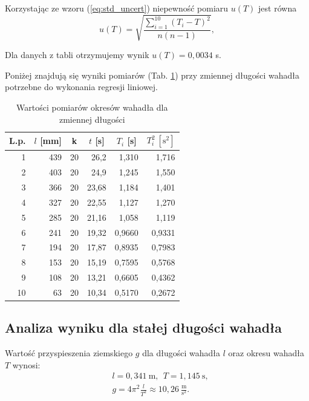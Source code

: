 \documentclass[12pt,a4paper]{article}
\numberwithin{equation}{section}
\begin{document}
Korzystając ze wzoru (\ref{eq:std_uncert}) niepewność pomiaru $u(T)$ jest równa
\begin{equation}
	u(T) = \sqrt{\frac{\sum_{i=1}^{10}(T_i - T)^2}{n(n-1)}},
\end{equation}

Dla danych z tabli otrzymujemy wynik $u(T) = 0,0034$ s.

Poniżej znajdują się wyniki pomiarów (Tab. \ref{tab:tab2}) przy zmiennej długości wahadła potrzebne do wykonania regresji liniowej.
\begin{table}[!ht]
	\caption{Wartości pomiarów okresów wahadła dla zmiennej długości}
	\begin{center}
		\begin{tabular}{r|r|r|r|r|r}
			\hline
			\multicolumn{1}{c|}{L.p.} & \multicolumn{1}{c|}{$l$ [mm]} & \multicolumn{1}{c|}{k} & \multicolumn{1}{c|}{$t$ [s]} & \multicolumn{1}{c|}{$T_i$ [s]} & \multicolumn{1}{c}{$T_{i}^{2} ~[\textrm{s}^2]$} \\ \hline \hline
			1 & 439 & 20 & 26,2 & 1,310 & 1,716 \\
			2 & 403 & 20 & 24,9 & 1,245 & 1,550 \\
			3 & 366 & 20 & 23,68 & 1,184 & 1,401 \\
			4 & 327 & 20 & 22,55 & 1,127 & 1,270 \\
			5 & 285 & 20 & 21,16 & 1,058 & 1,119\\
			6 & 241 & 20 & 19,32 & 0,9660 & 0,9331 \\
			7 & 194 & 20 & 17,87 & 0,8935 & 0,7983 \\
			8 & 153 & 20 & 15,19 & 0,7595 & 0,5768 \\
			9 & 108 & 20 & 13,21 & 0,6605 & 0,4362 \\
			10 & 63 & 20 & 10,34 & 0,5170 & 0,2672 \\ \hline
		\end{tabular}
	\end{center}
	\label{tab:tab2}
\end{table}

\pagebreak
\subsection{Analiza wyniku dla stałej długości wahadła}
Wartość przyspieszenia ziemskiego $g$ dla długości wahadła $l$ oraz okresu wahadła $T$ wynosi:
\begin{equation}
	\begin{split}
		&l = 0,341~\textrm{m},~~T = 1,145~\textrm{s}, \\ 
		&g = 4\pi^2\frac{l}{T^2} \approx 10,26~\frac{\textrm{m}}{\textrm{s}^2}.
	\end{split}
\end{equation}
\end{document}
